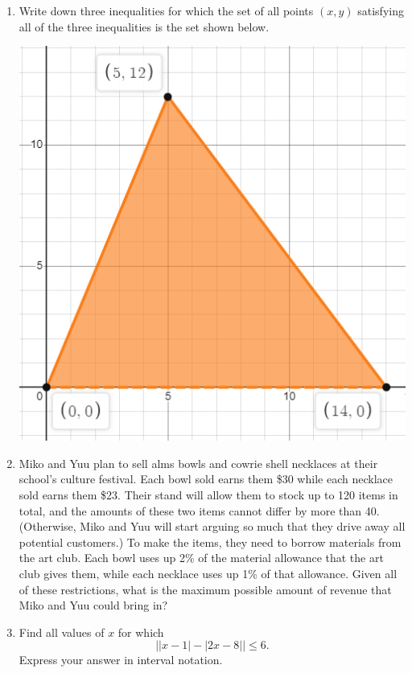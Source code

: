 \begin{enumerate}[resume]
\item Write down three inequalities for which the set of all points $(x,y)$ satisfying all of the three inequalities is the set shown below.
\begin{center}
\includegraphics[scale=0.4]{lin-ineq-triangle.png}
\end{center}
\item Miko and Yuu plan to sell alms bowls and cowrie shell necklaces at their school's culture festival. Each bowl sold earns them \$30 while each necklace sold earns them \$23. Their stand will allow them to stock up to 120 items in total, and the amounts of these two items cannot differ by more than 40. (Otherwise, Miko and Yuu will start arguing so much that they drive away all potential customers.) To make the items, they need to borrow materials from the art club. Each bowl uses up 2\% of the material allowance that the art club gives them, while each necklace uses up 1\% of that allowance. Given all of these restrictions, what is the maximum possible amount of revenue that Miko and Yuu could bring in?
\item Find all values of $x$ for which
\begin{equation*}
\lvert\lvert x - 1\rvert - \lvert 2x - 8\rvert\rvert\leq 6.
\end{equation*}
Express your answer in interval notation.
\end{enumerate}


